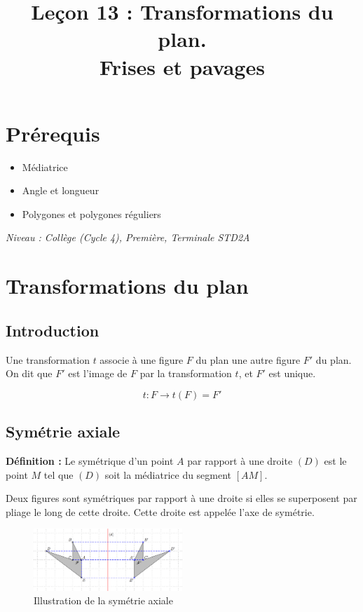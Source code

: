\documentclass[12pt]{article}
\title{Leçon 13 : Transformations du plan.\\ Frises et pavages}
\author{}
\date{}
\begin{document}
    \maketitle

    \section*{Prérequis}
    \begin{itemize}
        \item Médiatrice
        \item Angle et longueur
        \item Polygones et polygones réguliers
    \end{itemize}
    \textit{Niveau : Collège (Cycle 4), Première, Terminale STD2A}

    \tableofcontents
    \newpage

    \section{Transformations du plan}

    \subsection{Introduction}
    Une transformation \( t \) associe à une figure \( F \) du plan une autre figure \( F' \) du plan. On dit que \( F' \) est l'image de \( F \) par la transformation \( t \), et \( F' \) est unique.

    \[
        t : F \rightarrow t(F) = F'
    \]

    \subsection{Symétrie axiale}

    \textbf{Définition :} Le symétrique d’un point \( A \) par rapport à une droite \( (D) \) est le point \( M \) tel que \( (D) \) soit la médiatrice du segment \( [AM] \).

    Deux figures sont symétriques par rapport à une droite si elles se superposent par pliage le long de cette droite. Cette droite est appelée l’axe de symétrie.

    \begin{figure}[h!]
        \centering
        \includegraphics[width=0.5\textwidth]{symetrie_axiale.png}
        \caption{Illustration de la symétrie axiale}
    \end{figure}
\end{document}

